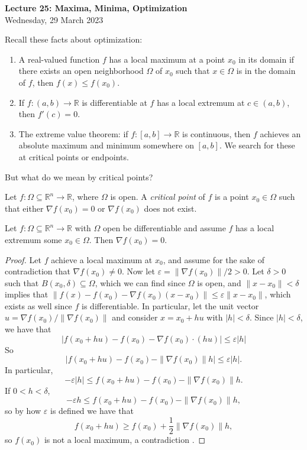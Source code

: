 \documentclass[11pt]{article}
\theoremstyle{definition}
\newcommand{\R}{\mathbb{R}}                      %
\begin{document}
\thispagestyle{empty}

\begin{center}
{\LARGE \bf Lecture 25: Maxima, Minima, Optimization}\\
{\large Wednesday, 29 March 2023}\\
\end{center}

Recall these facts about optimization:
\begin{enumerate}
    \item A real-valued function $f$ has a local maximum at a point $x_0$ in its domain if there exists an open neighborhood $\Omega$ of $x_0$ such that $x\in\Omega$ is in the domain of $f$, then $f(x)\leq f(x_0)$.
    \item If $f:(a,b)\to\R$ is differentiable at $f$ has a local extremum at $c\in(a,b)$, then $f'(c)=0$. 
    \item The extreme value theorem: if $f:[a,b]\to\R$ is continuous, then $f$ achieves an absolute maximum and minimum somewhere on $[a,b]$. We search for these at critical points or endpoints.
\end{enumerate}
But what do we mean by critical points?

\begin{mdframed}[backgroundcolor = blue!10]
\vspace{+0.1cm}

 Let $f:\Omega\subseteq \R^n\to \R$, where $\Omega$ is open. A \textit{critical point} of $f$ is a point $x_0\in\Omega$ such that either $\nabla f(x_0)=0$ or $\nabla f(x_0)$ does not exist.

\end{mdframed}

\prop Let $f:\Omega\subseteq \R^n\to\R$ with $\Omega$ open be differentiable and assume $f$ has a local extremum some $x_0\in \Omega$. Then $\nabla f(x_0)=0$.

\begin{proof}
    Let $f$ achieve a local maximum at $x_0$, and assume for the sake of contradiction that $\nabla f(x_0)\neq 0$. Now let $\varepsilon=\|\nabla f(x_0)\|/2>0$. Let $\delta>0$ such that $B(x_0,\delta)\subseteq \Omega$, which we can find since $\Omega$ is open, and $\|x-x_0\|<\delta$ implies that $\|f(x)-f(x_0)-\nabla f(x_0)(x-x_0)\|\leq \varepsilon\|x-x_0\|$, which exists as well since $f$ is differentiable. In particular, let the unit vector $u=\nabla f(x_0)/\|\nabla f(x_0)\|$ and consider $x=x_0+hu$ with $|h|<\delta$. Since $|h|<\delta$, we have that
    $$
    |f(x_0+hu)-f(x_0)-\nabla f(x_0)\cdot (hu)|\leq \varepsilon|h|
    $$
    So 
    $$
    |f(x_0+hu)-f(x_0)-\|\nabla f(x_0)\| h|\leq \varepsilon|h|.
    $$
    In particular, 
    $$
    -\varepsilon|h|\leq f(x_0+hu)-f(x_0)-\|\nabla f(x_0)\|h.
    $$
    If $0<h<\delta$,
    $$
    -\varepsilon h\leq f(x_0+hu)-f(x_0)-\|\nabla f(x_0)\|h,
    $$
    so by how $\varepsilon$ is defined we have that
    $$
    f(x_0+hu)\geq f(x_0)+\frac{1}{2}\|\nabla f(x_0)\|h,
    $$
    so $f(x_0)$ is not a local maximum, a contradiction \mbox{\lightning}.
    
\end{proof}
\end{document}
